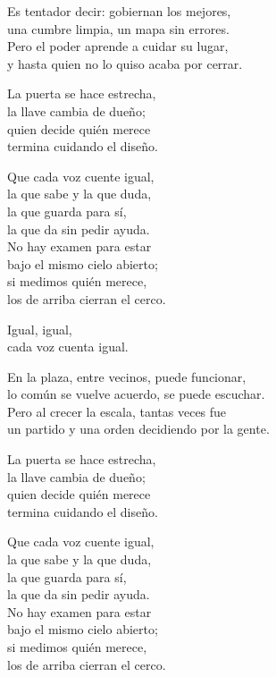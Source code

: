 \begin{lyrics}
Es tentador decir: gobiernan los mejores,\\
una cumbre limpia, un mapa sin errores.\\
Pero el poder aprende a cuidar su lugar,\\
y hasta quien no lo quiso acaba por cerrar.

La puerta se hace estrecha,\\
la llave cambia de dueño;\\
quien decide quién merece\\
termina cuidando el diseño.

Que cada voz cuente igual,\\
la que sabe y la que duda,\\
la que guarda para sí,\\
la que da sin pedir ayuda.\\
No hay examen para estar\\
bajo el mismo cielo abierto;\\
si medimos quién merece,\\
los de arriba cierran el cerco.

Igual, igual,\\
cada voz cuenta igual.

En la plaza, entre vecinos, puede funcionar,\\
lo común se vuelve acuerdo, se puede escuchar.\\
Pero al crecer la escala, tantas veces fue\\
un partido y una orden decidiendo por la gente.

La puerta se hace estrecha,\\
la llave cambia de dueño;\\
quien decide quién merece\\
termina cuidando el diseño.

Que cada voz cuente igual,\\
la que sabe y la que duda,\\
la que guarda para sí,\\
la que da sin pedir ayuda.\\
No hay examen para estar\\
bajo el mismo cielo abierto;\\
si medimos quién merece,\\
los de arriba cierran el cerco.


\end{lyrics}
